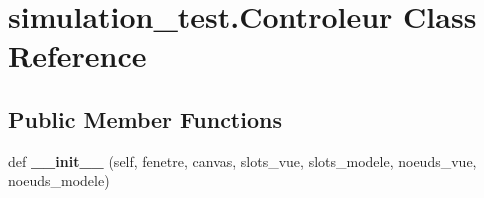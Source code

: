 \hypertarget{classsimulation__test_1_1Controleur}{}\section{simulation\+\_\+test.\+Controleur Class Reference}
\label{classsimulation__test_1_1Controleur}
\subsection*{Public Member Functions}
\begin{DoxyCompactItemize}
\item 
def {\bfseries \+\_\+\+\_\+init\+\_\+\+\_\+} (self, fenetre, canvas, slots\+\_\+vue, slots\+\_\+modele, noeuds\+\_\+vue, noeuds\+\_\+modele)\hypertarget{classsimulation__test_1_1Controleur_a42d1a1dd9e327afc0b49f35e3c7c9efa}{}\label{classsimulation__test_1_1Controleur_a42d1a1dd9e327afc0b49f35e3c7c9efa}

\end{DoxyCompactItemize}
